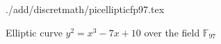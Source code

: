 \begin{figure}
\centering
 {./add/discretmath/picellipticfp97.tex}
\caption{Elliptic curve $y^2 = x^3 -7 x + 10$ over the field
  $\mathbb{F}_{97}$}
\label{fig:add:ellipticFp97}
\end{figure}